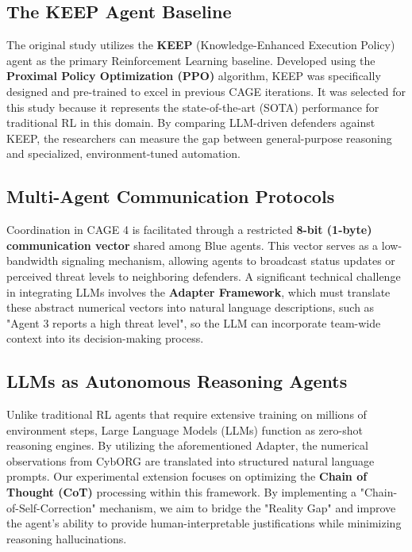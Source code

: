 \documentclass[letterpaper, 10 pt, conference]{ieeeconf}
\begin{document}
\subsection{The KEEP Agent Baseline}
The original study utilizes the \textbf{KEEP} (Knowledge-Enhanced Execution Policy) agent as the primary Reinforcement Learning baseline. Developed using the \textbf{Proximal Policy Optimization (PPO)} algorithm, KEEP was specifically designed and pre-trained to excel in previous CAGE iterations. It was selected for this study because it represents the state-of-the-art (SOTA) performance for traditional RL in this domain. By comparing LLM-driven defenders against KEEP, the researchers can measure the gap between general-purpose reasoning and specialized, environment-tuned automation.

\subsection{Multi-Agent Communication Protocols}
Coordination in CAGE 4 is facilitated through a restricted \textbf{8-bit (1-byte) communication vector} shared among Blue agents. This vector serves as a low-bandwidth signaling mechanism, allowing agents to broadcast status updates or perceived threat levels to neighboring defenders. A significant technical challenge in integrating LLMs involves the \textbf{Adapter Framework}, which must translate these abstract numerical vectors into natural language descriptions, such as "Agent 3 reports a high threat level", so the LLM can incorporate team-wide context into its decision-making process.

\subsection{LLMs as Autonomous Reasoning Agents}
Unlike traditional RL agents that require extensive training on millions of environment steps, Large Language Models (LLMs) function as zero-shot reasoning engines. By utilizing the aforementioned Adapter, the numerical observations from CybORG are translated into structured natural language prompts. Our experimental extension focuses on optimizing the \textbf{Chain of Thought (CoT)} processing within this framework. By implementing a "Chain-of-Self-Correction" mechanism, we aim to bridge the "Reality Gap" and improve the agent's ability to provide human-interpretable justifications while minimizing reasoning hallucinations.

\end{document}
